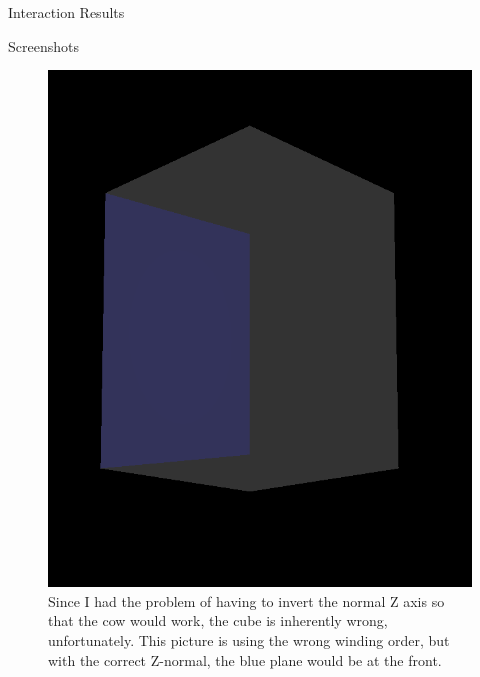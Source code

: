 \documentclass{article}
\begin{document}
\begin{section}{Interaction Results}
\begin{multicols}{2}
\begin{subsection}{Screenshots}
    \begin{figure}[H]
     \includegraphics[width=\linewidth]{./res/badcube.png}
     \caption{Since I had the problem of having to invert the normal Z axis so
that the cow would work, the cube is inherently wrong, unfortunately. This
picture is using the wrong winding order, but with the correct Z-normal, the
blue plane would be at the front.}
    \end{figure}


\end{subsection}
\end{multicols}
\end{section}
\end{document}
